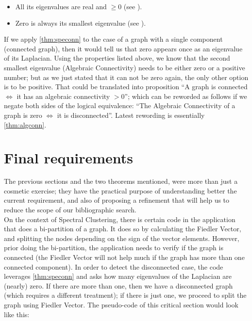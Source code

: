 \begin{itemize}
  \item All its eigenvalues are real and $ \ge 0$ (see \cite{strang88}). \\
  \item Zero is always its smallest eigenvalue (see \cite{luxburg07}).
\end{itemize}
\hfill

If we apply \cref{thm:speconn} to the case of a graph with a single
component (connected graph), then it would tell us that zero appears
once as an eigenvalue of its Laplacian. Using the properties listed above, we
know that the second smallest eigenvalue (Algebraic Connectivity)
needs to be either zero or a 
positive number; but as we just stated that it can not be zero again, the
only other option is to be positive. That could be translated into
proposition  ``A graph is connected $\iff$ it has an algebraic
connectivity $> 0$''; which can be reworded as follows if we negate both sides of
the logical equivalence: ``The
Algebraic Connectivity of a graph is zero $\iff$ it is
disconnected''. Latest rewording is essentially \cref{thm:algconn}.

\section{Final requirements}

The previous sections and the two theorems mentioned, were more than
just a cosmetic exercise; they have the practical purpose of
understanding better the current requirement, and also of proposing a
refinement that will help us to reduce the scope of our bibliographic
search. \\

On the context of Spectral Clustering, there is certain code in the
application that does a bi-partition of a graph. It does so by
calculating the Fiedler Vector, and splitting the nodes depending on
the sign of the vector elements. However, prior doing the
bi-partition, the application needs to verify if the graph is
connected (the Fiedler Vector will not help much if the graph has more
than one connected component). In order to detect the disconnected
case, the code leverages \cref{thm:speconn} and asks how many
eigenvalues of the Laplacian are (nearly) 
zero. If there are more than one, then we have a disconnected graph
(which requires a different treatment); if there is just one, we
proceed to split the graph using Fiedler Vector. The pseudo-code of
this critical section would look like this: \\


